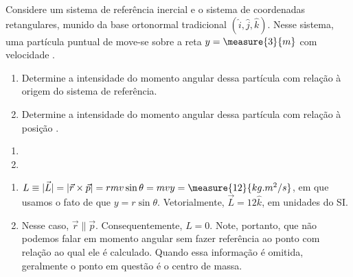 \begin{question}
    Considere um sistema de referência inercial e o sistema de coordenadas retangulares, munido da base ortonormal tradicional $(\hat i, \hat j, \hat k)$.
    Nesse sistema, uma partícula puntual de  move-se sobre a reta $y = \measure{3}{m}$ com velocidade .
    \begin{enumerate}
      \item Determine a intensidade do momento angular dessa partícula com relação à origem do sistema de referência.
      \item Determine a intensidade do momento angular dessa partícula com relação à posição .
    \end{enumerate}

    \begin{answer}
      \begin{enumerate}
        \item {}
        \item {}
      \end{enumerate}
    \end{answer}
    
    \begin{solution}
      \begin{enumerate}
        \item $L \equiv |\vec L| = |\vec r \times \vec p| = r m v \sin\theta = m v y = \measure{12}{kg.m^2/s}$, em que usamos o fato de que $y = r \sin\theta$.
        Vetorialmente, $\vec L = 12\hat k$, em unidades do SI.
        \item Nesse caso, $\vec r \parallel \vec p$.
        Consequentemente, $L = 0$.
        Note, portanto, que não podemos falar em momento angular sem fazer referência ao ponto com relação ao qual ele é calculado.
        Quando essa informação é omitida, geralmente o ponto em questão é o centro de massa.
      \end{enumerate}
    \end{solution}
\end{question}
